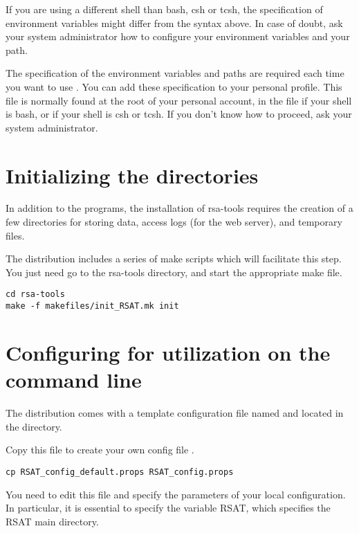 \documentclass{book}
\begin{document}
If you are using a different shell than bash, csh or tcsh, the
specification of environment variables might differ from the syntax
above.  In case of doubt, ask your system administrator how to
configure your environment variables and your path.

The specification of the environment variables and paths are required
each time you want to use \RSAT. You can add these specification to
your personal profile.  This file is normally found at the root of
your personal account, in the file  if your shell is
bash, or  if your shell is csh or tcsh. If you don't know
how to proceed, ask your system administrator.



\section{Initializing the directories}

In addition to the programs, the installation of rsa-tools requires
the creation of a few directories for storing data, access logs (for
the web server), and temporary files.

The distribution includes a series of make scripts which will
facilitate this step. You just need go to the rsa-tools directory, and
start the appropriate make file.

\begin{verbatim}
cd rsa-tools
make -f makefiles/init_RSAT.mk init
\end{verbatim}


\section{Configuring \RSAT for utilization on the command line}

The \RSAT distribution comes with a template configuration file named
 and located in the 
directory.

Copy this file to create your own config file .

\begin{verbatim}
cp RSAT_config_default.props RSAT_config.props
\end{verbatim}

You need to edit this file and specify the parameters of your local
configuration. In particular, it is essential to specify the variable
RSAT, which specifies the RSAT main directory.
\end{document}
